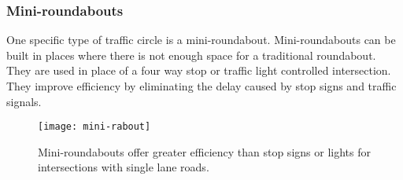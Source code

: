 \clearpage

\subsubsection{Mini-roundabouts}
One specific type of traffic circle is a mini-roundabout.  Mini-roundabouts can be built in places where there is not enough space for a traditional roundabout.  They are used in place of a four way stop or traffic light controlled intersection.  They improve efficiency by eliminating the delay caused by stop signs and traffic signals.

\begin{figure}[!htbp]
\centering
\texttt{[image: mini-rabout]}
\caption[Mini-Roundabout]{Mini-roundabouts offer greater efficiency than stop signs or lights for intersections with single lane roads\cite{rabout5}.}\label{fig:mini-rabout}
\end{figure}
